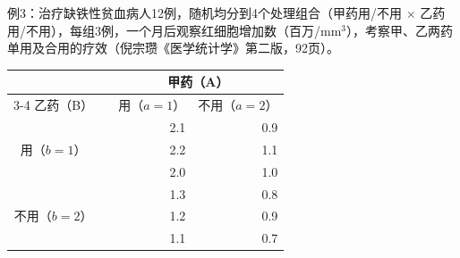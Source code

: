 例3：治疗缺铁性贫血病人12例，随机均分到4个处理组合（甲药用/不用 $\times$ 乙药用/不用），每组3例，一个月后观察红细胞增加数（百万/mm$^3$），考察甲、乙两药单用及合用的疗效（倪宗瓒《医学统计学》第二版，92页）。
\par\noindent\begin{minipage}{\linewidth}
\begin{center}\begin{tabular}{ccrr}
\toprule &&\multicolumn{2}{c}{甲药（A）}\\\cmidrule(lr){3-4}
乙药（B）&&用（$a=1$）&不用（$a=2$）\\\midrule
\multirow{3}{*}{用（$b=1$）}&&2.1&0.9\\&&2.2&1.1\\&&2.0&1.0\\\midrule
\multirow{3}{*}{不用（$b=2$）}&&1.3&0.8\\&&1.2&0.9\\&&1.1&0.7\\\bottomrule
\end{tabular}\end{center}
\end{minipage}\par\medskip

